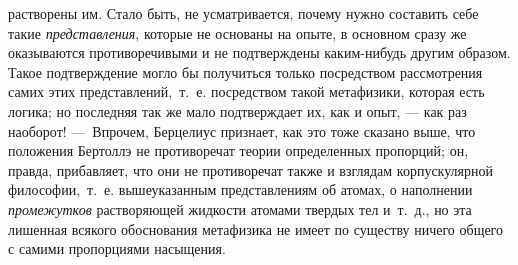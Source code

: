 растворены им. Стало быть, не усматривается, почему нужно составить себе
такие {\em представления}, которые не основаны на
опыте, в основном сразу же оказываются противоречивыми и не подтверждены
каким-нибудь другим образом. Такое подтверждение могло бы получиться только
посредством рассмотрения самих этих представлений,~т.~е. посредством такой
метафизики, которая есть логика; но последняя так же мало подтверждает их,
как и опыт, — как раз наоборот! —~Впрочем, Берцелиус признает, как это тоже
сказано выше, что положения Бертоллэ не противоречат теории определенных
пропорций; он, правда, прибавляет, что они не противоречат также и взглядам
корпускулярной философии,~т.~е. вышеуказанным представлениям об атомах, о
наполнении {\em промежутков} растворяющей жидкости
атомами твердых тел и~т.~д., но эта лишенная всякого обоснования метафизика
не имеет по существу ничего общего с самими пропорциями насыщения.

